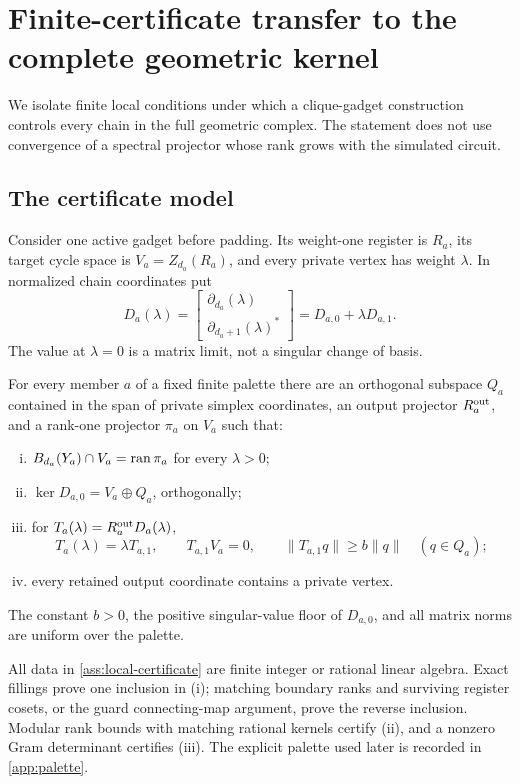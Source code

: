 \section{Finite-certificate transfer to the complete geometric kernel}
\label{sec:transfer}

We isolate finite local conditions under which a clique-gadget construction
controls every chain in the full geometric complex.  The statement does not
use convergence of a spectral projector whose rank grows with the simulated
circuit.

\subsection{The certificate model}

Consider one active gadget before padding.  Its weight-one register is \(R_a\),
its target cycle space is \(V_a=Z_{d_a}(R_a)\), and every private vertex has
weight \(\lambda\).  In normalized chain coordinates put
\[
D_a(\lambda)=
\begin{bmatrix}\partial_{d_a}(\lambda)\\
\partial_{d_a+1}(\lambda)^*\end{bmatrix}
=D_{a,0}+\lambda D_{a,1}.
\]
The value at \(\lambda=0\) is a matrix limit, not a singular change of basis.

\begin{assumption}
\label{ass:local-certificate}
For every member \(a\) of a fixed finite palette there are an orthogonal
subspace \(Q_a\) contained in the span of private simplex coordinates, an
output projector \(R_a^{\rm out}\), and a rank-one
projector \(\pi_a\) on \(V_a\) such that:
\begin{enumerate}[(i)]
\item \(B_{d_a}(Y_a)\cap V_a=\operatorname{ran}\pi_a\) for every \(\lambda>0\);
\item \(\ker D_{a,0}=V_a\oplus Q_a\), orthogonally;
\item for \(T_a(\lambda)=R_a^{\rm out}D_a(\lambda)\),
\[
T_a(\lambda)=\lambda T_{a,1},\qquad T_{a,1}V_a=0,\qquad
\|T_{a,1}q\|\ge b\|q\|\quad(q\in Q_a);
\]
\item every retained output coordinate contains a private vertex.
\end{enumerate}
The constant \(b>0\), the positive singular-value floor of \(D_{a,0}\), and
all matrix norms are uniform over the palette.
\end{assumption}

All data in \cref{ass:local-certificate} are finite integer or rational linear
algebra.  Exact fillings prove one inclusion in (i); matching boundary ranks
and surviving register cosets, or the guard connecting-map argument, prove the
reverse inclusion.  Modular rank bounds with matching rational kernels certify
(ii), and a nonzero Gram determinant certifies (iii).
The explicit palette used later is recorded in \cref{app:palette}.

